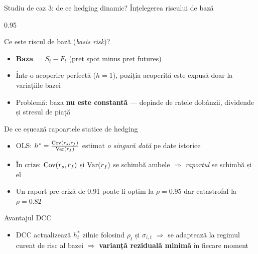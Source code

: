 \documentclass[9pt, aspectratio=169, t]{beamer}
\begin{document}
\begin{frame}{Studiu de caz 3: de ce hedging dinamic? Înțelegerea riscului de bază}
    \begin{cminipage}{0.95\textwidth}
    {\footnotesize
    \begin{block}{Ce este riscul de bază (\textit{basis risk})?}
        \begin{itemize}\setlength{\itemsep}{1pt}
            \item \textbf{Baza} $= S_t - F_t$ (preț spot minus preț futures)
            \item Într-o acoperire perfectă ($h = 1$), poziția acoperită este expusă doar la variațiile bazei
            \item Problemă: baza \textbf{nu este constantă} --- depinde de ratele dobânzii, dividende și stresul de piață
        \end{itemize}
    \end{block}
    \begin{block}{De ce eșuează rapoartele statice de hedging}
        \begin{itemize}\setlength{\itemsep}{1pt}
            \item OLS: $h^* = \frac{\text{Cov}(r_s, r_f)}{\text{Var}(r_f)}$ estimat \textit{o singură dată} pe date istorice
            \item În crize: $\text{Cov}(r_s, r_f)$ și $\text{Var}(r_f)$ se schimbă ambele $\Rightarrow$ \textit{raportul} se schimbă și el
            \item Un raport pre-criză de 0.91 poate fi optim la $\rho = 0.95$ dar catastrofal la $\rho = 0.82$
        \end{itemize}
    \end{block}
    \begin{alertblock}{Avantajul DCC}
        \begin{itemize}\setlength{\itemsep}{0pt}
            \item DCC actualizează $h_t^*$ zilnic folosind $\rho_t$ și $\sigma_{i,t}$ $\Rightarrow$ se adaptează la regimul curent de risc al bazei $\Rightarrow$ \textbf{varianță reziduală minimă} în fiecare moment
        \end{itemize}
    \end{alertblock}
    }
    \end{cminipage}
\end{frame}
\end{document}
